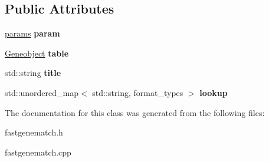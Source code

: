 \subsection*{Public Attributes}
\begin{DoxyCompactItemize}
\item 
\hypertarget{classfastgenematch_1_1Genematch__converter_a8005b5b0aeae31f2d360e6b055c94021}{
\hyperlink{structfastgenematch_1_1Genematch__converter_1_1params}{params} {\bfseries param}}
\label{classfastgenematch_1_1Genematch__converter_a8005b5b0aeae31f2d360e6b055c94021}

\item 
\hypertarget{classfastgenematch_1_1Genematch__converter_a5fc827f8b0b9cdfa0568a3659eaecc8f}{
\hyperlink{classfastgenematch_1_1Geneobject}{Geneobject} {\bfseries table}}
\label{classfastgenematch_1_1Genematch__converter_a5fc827f8b0b9cdfa0568a3659eaecc8f}

\item 
\hypertarget{classfastgenematch_1_1Genematch__converter_a1dda29ed6052d0134e2b3d4a66299b44}{
std::string {\bfseries title}}
\label{classfastgenematch_1_1Genematch__converter_a1dda29ed6052d0134e2b3d4a66299b44}

\item 
\hypertarget{classfastgenematch_1_1Genematch__converter_aae4e4312aa893f5278b67115100b6364}{
std::unordered\_\-map$<$ std::string, format\_\-types $>$ {\bfseries lookup}}
\label{classfastgenematch_1_1Genematch__converter_aae4e4312aa893f5278b67115100b6364}

\end{DoxyCompactItemize}


The documentation for this class was generated from the following files:\begin{DoxyCompactItemize}
\item 
fastgenematch.h\item 
fastgenematch.cpp\end{DoxyCompactItemize}
